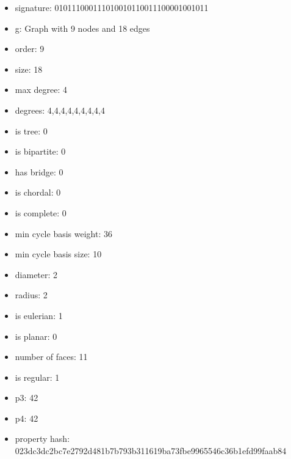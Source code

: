 \newpage
\begin{figure}
\end{figure}
\begin{itemize}
\item signature: 010111000111010010110011100001001011
\item g: Graph with 9 nodes and 18 edges
\item order: 9
\item size: 18
\item max degree: 4
\item degrees: 4,4,4,4,4,4,4,4,4
\item is tree: 0
\item is bipartite: 0
\item has bridge: 0
\item is chordal: 0
\item is complete: 0
\item min cycle basis weight: 36
\item min cycle basis size: 10
\item diameter: 2
\item radius: 2
\item is eulerian: 1
\item is planar: 0
\item number of faces: 11
\item is regular: 1
\item p3: 42
\item p4: 42
\item property hash: 023dc3dc2bc7e2792d481b7b793b311619ba73fbe9965546c36b1efd99faab84
\end{itemize}
